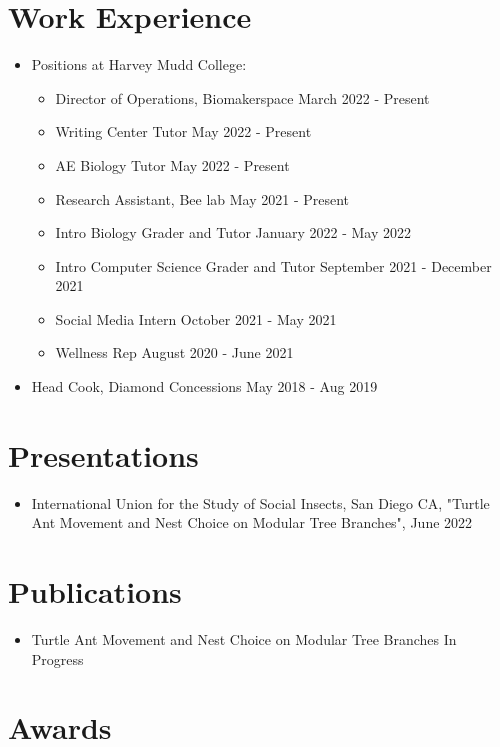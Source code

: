 \documentclass[letterpaper]{article}
\begin{document}
\section*{Work Experience}

\begin{itemize}
\item Positions at Harvey Mudd College:
\begin{itemize}
  \item Director of Operations, Biomakerspace \hfill March 2022 - Present
  \item Writing Center Tutor \hfill May 2022 - Present
  \item AE Biology Tutor \hfill May 2022 - Present
  \item Research Assistant, Bee lab \hfill May 2021 - Present
  \item Intro Biology Grader and Tutor \hfill January 2022 - May 2022
  \item Intro Computer Science Grader and Tutor \hfill September 2021 - December 2021
  \item Social Media Intern \hfill October 2021 - May 2021
  \item Wellness Rep \hfill August 2020 - June 2021
\end{itemize}
\item Head Cook, Diamond Concessions \hfill May 2018 - Aug 2019
\end{itemize}

\section*{Presentations}
\begin{itemize}
\item International Union for the Study of Social Insects, San Diego CA, "Turtle Ant Movement and Nest Choice on Modular Tree Branches", June 2022
\end{itemize}
\section*{Publications}

\begin{itemize}
\item Turtle Ant Movement and Nest Choice on Modular Tree Branches \hfill In Progress
\end{itemize}

\section*{Awards}
\end{document}
